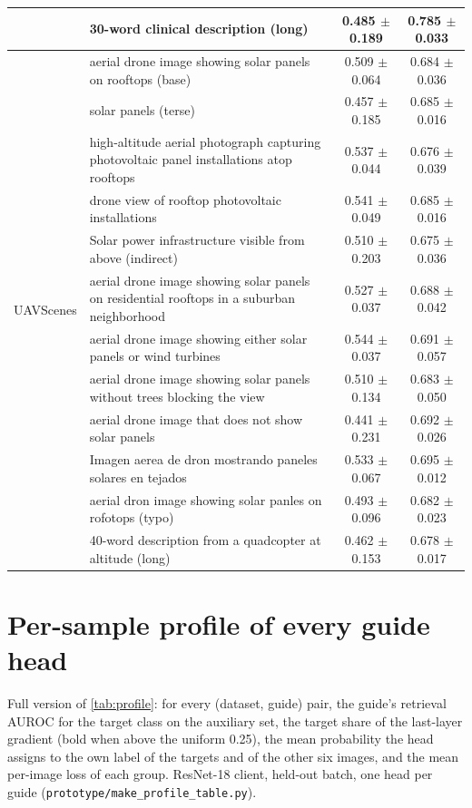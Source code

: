 \begin{table}[h]
\begin{tabular}{llcc}
 & 30-word clinical description (long) & 0.485 $\pm$ 0.189 & 0.785 $\pm$ 0.033 \\
\midrule
\multirow{12}{*}{UAVScenes}
 & aerial drone image showing solar panels on rooftops (base) & 0.509 $\pm$ 0.064 & 0.684 $\pm$ 0.036 \\
 & solar panels (terse) & 0.457 $\pm$ 0.185 & 0.685 $\pm$ 0.016 \\
 & high-altitude aerial photograph capturing photovoltaic panel installations atop rooftops & 0.537 $\pm$ 0.044 & 0.676 $\pm$ 0.039 \\
 & drone view of rooftop photovoltaic installations & 0.541 $\pm$ 0.049 & 0.685 $\pm$ 0.016 \\
 & Solar power infrastructure visible from above (indirect) & 0.510 $\pm$ 0.203 & 0.675 $\pm$ 0.036 \\
 & aerial drone image showing solar panels on residential rooftops in a suburban neighborhood & 0.527 $\pm$ 0.037 & 0.688 $\pm$ 0.042 \\
 & aerial drone image showing either solar panels or wind turbines & 0.544 $\pm$ 0.037 & 0.691 $\pm$ 0.057 \\
 & aerial drone image showing solar panels without trees blocking the view & 0.510 $\pm$ 0.134 & 0.683 $\pm$ 0.050 \\
 & aerial drone image that does not show solar panels & 0.441 $\pm$ 0.231 & 0.692 $\pm$ 0.026 \\
 & Imagen aerea de dron mostrando paneles solares en tejados & 0.533 $\pm$ 0.067 & 0.695 $\pm$ 0.012 \\
 & aerial dron image showing solar panles on rofotops (typo) & 0.493 $\pm$ 0.096 & 0.682 $\pm$ 0.023 \\
 & 40-word description from a quadcopter at altitude (long) & 0.462 $\pm$ 0.153 & 0.678 $\pm$ 0.017 \\
\bottomrule
\end{tabular}
\end{table}

\section{Per-sample profile of every guide head}
\label{sec:suppl_profile}
Full version of \cref{tab:profile}: for every (dataset, guide) pair, the guide's retrieval AUROC for the target class on the auxiliary set, the target share of the last-layer gradient (bold when above the uniform 0.25), the mean probability the head assigns to the own label of the targets and of the other six images, and the mean per-image loss of each group. ResNet-18 client, held-out batch, one head per guide (\texttt{prototype/make\_profile\_table.py}).

\begin{table}[h]
\centering
\small
\caption{Per-sample profile of the private batch under every ResNet-18 guide head.}
\label{tab:profile_full}

\end{table}

